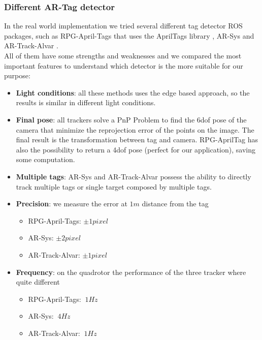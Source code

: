 \subsubsection{Different AR-Tag detector}
In the real world implementation we tried several different tag detector ROS packages, such as  RPG-April-Tags \cite{rpgapriltags} that uses the  AprilTags library \cite{apriltagslibrary}, AR-Sys \cite{arsys} and AR-Track-Alvar \cite{artrackalvar}.\\
All of them have some strengths and weaknesses and we compared the most important features to understand which detector is the more suitable for our purpose:
\begin{itemize}
\item \textbf{Light conditions}: all these methods uses the edge based approach, so the results is similar in different light conditions.
\item \textbf{Final pose}: all trackers solve a PnP Problem to find the 6dof pose of the camera that minimize the reprojection error of the points on the image. The final result is the transformation between tag and camera. RPG-AprilTag has also the possibility to return a 4dof pose (perfect for our application), saving some computation.
\item \textbf{Multiple tags}: AR-Sys and AR-Track-Alvar possess the ability to directly track multiple tags or single target composed by multiple tags.
\item \textbf{Precision}: we measure the error at $1m$ distance from the tag
\begin{itemize}
\item RPG-April-Tags: $\pm 1 pixel $ 
\item AR-Sys: $\pm 2 pixel $
\item AR-Track-Alvar: $\pm 1 pixel $
\end{itemize}
\item \textbf{Frequency}: on the quadrotor the performance of the three tracker where quite different
\begin{itemize}
\item RPG-April-Tags: $~1Hz$
\item AR-Sys: $~4Hz$
\item AR-Track-Alvar: $~1Hz$
\end{itemize}
\end{itemize}

